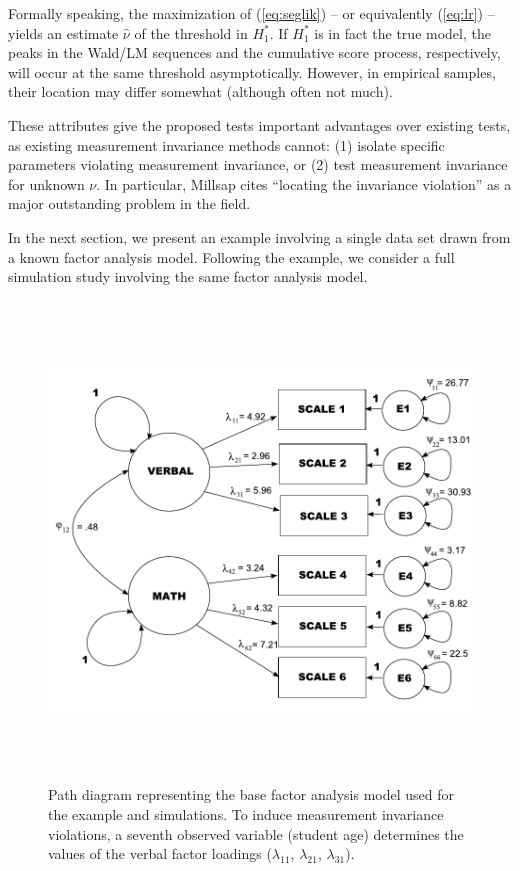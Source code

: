 \documentclass[man]{apa}
\begin{document}
Formally speaking, the maximization of (\ref{eq:seglik}) -- or equivalently (\ref{eq:lr}) --
yields an estimate $\hat \nu$ of the threshold in $H_1^*$. If $H_1^*$ is in fact the true model,
the peaks in the Wald/LM sequences and the cumulative score process, respectively, will occur at the
same threshold asymptotically. However, in empirical samples, their location may differ somewhat
(although often not much).

These attributes give the proposed tests important advantages over
existing tests, as existing measurement invariance methods cannot:
(1) isolate specific parameters violating measurement invariance, or
(2) test measurement invariance for unknown $\nu$. 
In particular, Millsap \citeyear{Mil05} cites
``locating the invariance violation'' as a major outstanding problem
in the field.

In the next section, we present an example involving a single data set
drawn from a 
known factor analysis model.  Following the example, we consider a
full simulation study involving the same factor analysis model.

\begin{figure}
\caption{Path diagram representing the base factor analysis model used for
  the example and simulations.  To induce measurement invariance
  violations, a seventh observed variable (student age) determines the
values of the verbal factor loadings ($\lambda_{11}$, $\lambda_{21}$,
$\lambda_{31}$).}
\label{fig:famod}
\includegraphics[height=5in]{famod.pdf}
%
\end{figure}
\end{document}
